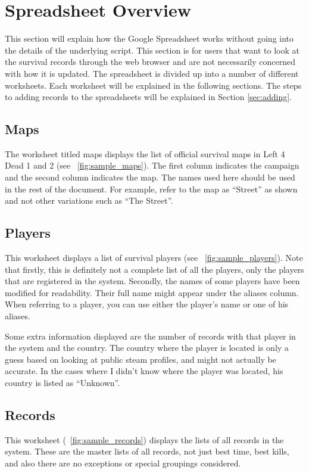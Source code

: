 \section{Spreadsheet Overview}
This section will explain how the Google Spreadsheet works without going into the details of the underlying script. This section is for users that want to look at the survival records through the web browser and are not necessarily concerned with how it is updated. The spreadsheet is divided up into a number of different worksheets. Each worksheet will be explained in the following sections. The steps to adding records to the spreadsheets will be explained in Section \ref{sec:adding}.

\subsection{Maps}
The worksheet titled maps displays the list of official survival maps in Left 4 Dead 1 and 2 (see \figurename\ \ref{fig:sample_maps}). The first column indicates the campaign and the second column indicates the map. The names used here should be used in the rest of the document. For example, refer to the map as ``Street'' as shown and not other variations such as ``The Street''.

\subsection{Players}
This worksheet displays a list of survival players (see \figurename\ \ref{fig:sample_players}). Note that firstly, this is definitely not a complete list of all the players, only the players that are registered in the system. Secondly, the names of some players have been modified for readability. Their full name might appear under the aliases column. When referring to a player, you can use either the player's name or one of his aliases.

Some extra information displayed are the number of records with that player in the system and the country. The country where the player is located is only a guess based on looking at public steam profiles, and might not actually be accurate. In the cases where I didn't know where the player was located, his country is listed as ``Unknown''.

\subsection{Records}
This worksheet (\figurename\ \ref{fig:sample_records}) displays the lists of all records in the system. These are the master lists of all records, not just best time, best kills, and also there are no exceptions or special groupings considered.

